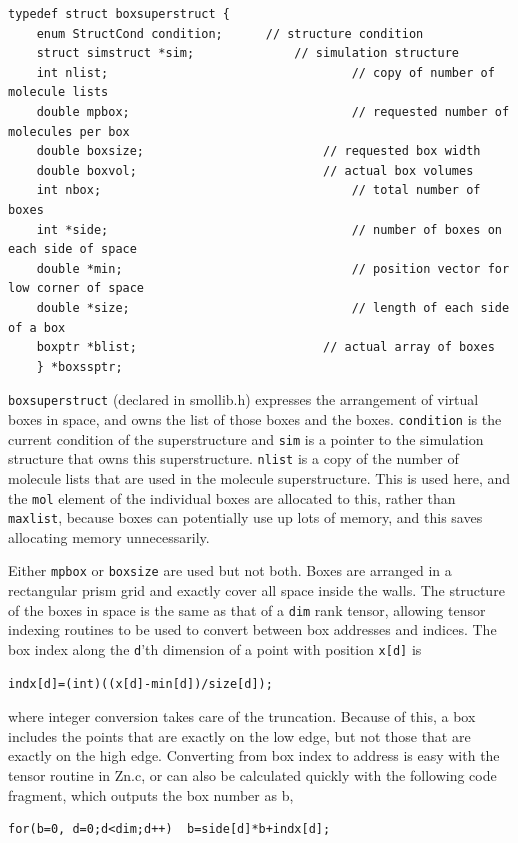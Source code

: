 \documentclass {scrbook}
\newcommand {\ttt} {\texttt}
\begin{document}
\begin{lstlisting}
typedef struct boxsuperstruct {
	enum StructCond condition;		// structure condition
	struct simstruct *sim;				// simulation structure
	int nlist;									// copy of number of molecule lists
	double mpbox;								// requested number of molecules per box
	double boxsize;							// requested box width
	double boxvol;							// actual box volumes
	int nbox;									// total number of boxes
	int *side;									// number of boxes on each side of space
	double *min;								// position vector for low corner of space
	double *size;								// length of each side of a box
	boxptr *blist; 							// actual array of boxes
	} *boxssptr;
\end{lstlisting}

\ttt{boxsuperstruct} (declared in smollib.h) expresses the arrangement of virtual boxes in space, and owns the list of those boxes and the boxes. \ttt{condition} is the current condition of the superstructure and \ttt{sim} is a pointer to the simulation structure that owns this superstructure. \ttt{nlist} is a copy of the number of molecule lists that are used in the molecule superstructure. This is used here, and the \ttt{mol} element of the individual boxes are allocated to this, rather than \ttt{maxlist}, because boxes can potentially use up lots of memory, and this saves allocating memory unnecessarily.

Either \ttt{mpbox} or \ttt{boxsize} are used but not both. Boxes are arranged in a rectangular prism grid and exactly cover all space inside the walls. The structure of the boxes in space is the same as that of a \ttt{dim} rank tensor, allowing tensor indexing routines to be used to convert between box addresses and indices. The box index along the \ttt{d}'th dimension of a point with position \ttt{x[d]} is

\begin{lstlisting}
indx[d]=(int)((x[d]-min[d])/size[d]);
\end{lstlisting}

where integer conversion takes care of the truncation. Because of this, a box includes the points that are exactly on the low edge, but not those that are exactly on the high edge. Converting from box index to address is easy with the tensor routine in Zn.c, or can also be calculated quickly with the following code fragment, which outputs the box number as b, 

\begin{lstlisting}
for(b=0, d=0;d<dim;d++)  b=side[d]*b+indx[d];
\end{lstlisting}
\end{document}
